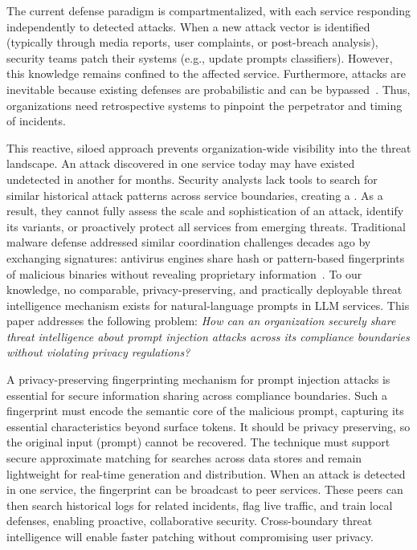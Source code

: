 The current defense paradigm is compartmentalized, with each service responding independently to detected attacks. When a new attack vector is identified (typically through media reports, user complaints, or post-breach analysis), security teams patch their systems (e.g., update prompts classifiers). However, this knowledge remains confined to the affected service. 
Furthermore, attacks are inevitable because existing defenses are probabilistic and can be bypassed~\cite{Debenedetti2025defeating, costa2025securingaiagentsinformationflow}.
Thus, organizations need retrospective systems to pinpoint the perpetrator and timing of incidents.



%
This reactive, siloed approach prevents organization-wide visibility into the threat landscape. An attack discovered in one service today may have existed undetected in another for months. Security analysts lack tools to search for similar historical attack patterns across service boundaries, creating a . As a result, they cannot fully assess the scale and sophistication of an attack, identify its variants, or proactively protect all services from emerging threats.
%
Traditional malware defense addressed similar coordination challenges decades ago by exchanging signatures: antivirus engines share hash or pattern-based fingerprints of malicious binaries without revealing proprietary information~\cite{li2019reading}. To our knowledge, no comparable, privacy-preserving, and practically deployable threat intelligence mechanism exists for natural-language prompts in LLM services. This paper addresses the following problem: \emph{How can an organization securely share threat intelligence about prompt injection attacks across its compliance boundaries without violating privacy regulations?}

A privacy-preserving fingerprinting mechanism for prompt injection attacks is essential for secure information sharing across compliance boundaries. Such a fingerprint must encode the semantic core of the malicious prompt, capturing its essential characteristics beyond surface tokens. 
It should be privacy preserving, so the original input (prompt) cannot be recovered. The technique must support secure approximate matching for  searches across data stores and remain lightweight for real-time generation and distribution.
%
When an attack is detected in one service, the fingerprint can be broadcast to peer services. These peers can then search historical logs for related incidents, flag live traffic, and train local defenses, enabling proactive, collaborative security. Cross-boundary threat intelligence will enable faster patching without compromising user privacy.


